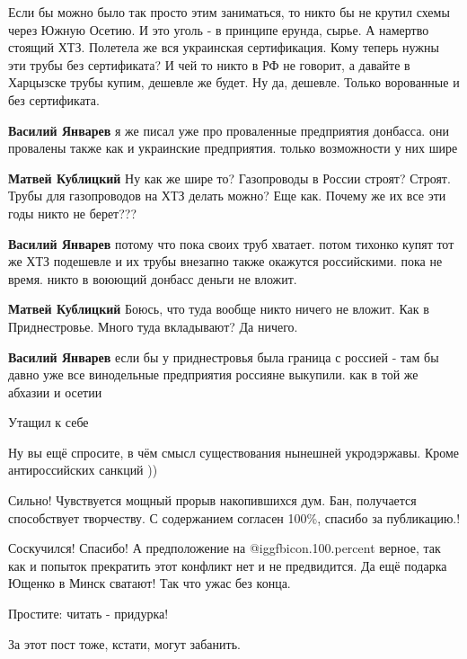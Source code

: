\begin{itemize}
\begin{itemize}
Если бы можно было так просто этим заниматься, то никто бы не крутил схемы через Южную Осетию. И это уголь - в принципе ерунда, сырье. А намертво стоящий ХТЗ. Полетела же вся украинская сертификация. Кому теперь нужны эти трубы без сертификата? И чей то никто в РФ не говорит, а давайте в Харцызске трубы купим, дешевле же будет. Ну да, дешевле. Только ворованные и без сертификата.

\textbf{Василий Январев} я же писал уже про проваленные предприятия донбасса. они провалены также как и украинские предприятия. только возможности у них шире

\textbf{Матвей Кублицкий} Ну как же шире то? Газопроводы в России строят? Строят. Трубы для газопроводов на ХТЗ делать можно? Еще как. Почему же их все эти годы никто не берет???

\textbf{Василий Январев} потому что пока своих труб хватает. потом тихонко купят тот же ХТЗ подешевле и их трубы внезапно также окажутся российскими. пока не время. никто в воюющий донбасс деньги не вложит.

\textbf{Матвей Кублицкий} Боюсь, что туда вообще никто ничего не вложит. Как в Приднестровье. Много туда вкладывают? Да ничего.

\textbf{Василий Январев} если бы у приднестровья была граница с россией - там бы давно уже все винодельные предприятия россияне выкупили. как в той же абхазии и осетии

\end{itemize} %

Утащил к себе

Ну вы ещё спросите, в чём смысл существования нынешней укродэржавы. Кроме антироссийских санкций ))


Сильно! Чувствуется мощный прорыв накопившихся дум. Бан, получается способствует
творчеству. С содержанием согласен 100\%, спасибо за публикацию.!


Соскучился! Спасибо! А предположение на  @igg{fbicon.100.percent}  верное, так как и попыток прекратить
этот конфликт нет и не предвидится. Да ещё подарка Ющенко в Минск сватают! Так
что ужас без конца.

Простите: читать - придурка!

За этот пост тоже, кстати, могут забанить.

\end{itemize} %
